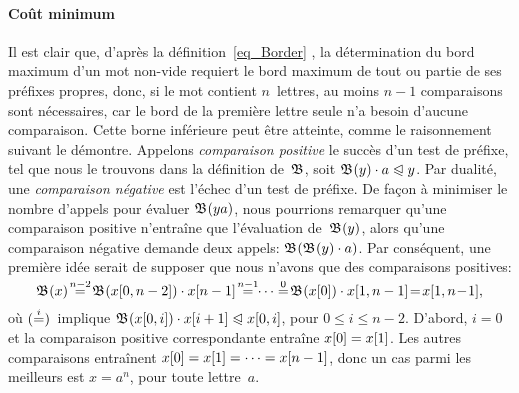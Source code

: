 \paragraph{Coût minimum}

Il est clair que, d'après la définition~\eqref{eq_Border}
, la détermination du bord maximum d'un mot
non-vide requiert le bord maximum de tout ou partie de ses préfixes
propres, donc, si le mot contient \(n\)~lettres, au moins \(n-1\)
comparaisons sont nécessaires, car le bord de la première lettre seule
n'a besoin d'aucune comparaison. Cette borne inférieure peut être
atteinte, comme le raisonnement suivant le démontre. Appelons
\emph{comparaison positive} le succès d'un test de préfixe,
tel que nous le trouvons dans la définition de~\(\mathfrak{B}\), soit
\(\mathfrak{B}^{}(y) \cdot a \mathrel{\trianglelefteqslant} y\). Par dualité, une \emph{comparaison
  négative} est
l'échec d'un test de préfixe. De façon à minimiser le nombre d'appels
pour évaluer \(\mathfrak{B}^{}(ya)\), nous pourrions remarquer qu'une
comparaison positive n'entraîne que l'évaluation de~\(\mathfrak{B}^{}(y)\),
alors qu'une comparaison négative demande deux appels:
\(\mathfrak{B}^{}(\mathfrak{B}^{}(y) \cdot a)\). Par conséquent, une première idée
serait de supposer que nous n'avons que des comparaisons positives:
\begin{equation*}
\Border{}{x} \!\eqn{n-2}\! 
\Border{}{\ind{x}{0,n-2}} \cdot \ind{x}{n-1}
\!\eqn{n-1}\!\! \dots
\eqn{0}\! \Border{}{\ind{x}{0}} \cdot \ind{x}{1,n-1}
\!=\! \ind{x}{1,n\!-\!1},
\end{equation*}
où \((\smash{\mathrel{\stackrel{\smash{i}}{=}}})\)~implique \(\mathfrak{B}^{}({x}[{0,i}]) \cdot
{x}[{i+1}] \mathrel{\trianglelefteqslant} {x}[{0,i}]\), pour \(0 \leqslant i \leqslant
n-2\). D'abord, \(i=0\) et la comparaison positive correspondante
entraîne \({x}[{0}] = {x}[{1}]\). Les autres comparaisons
entraînent \({x}[{0}] = {x}[{1}] = \dots = {x}[{n-1}]\), donc un
cas parmi les meilleurs est \(x=a^n\), pour toute lettre~\(a\).

